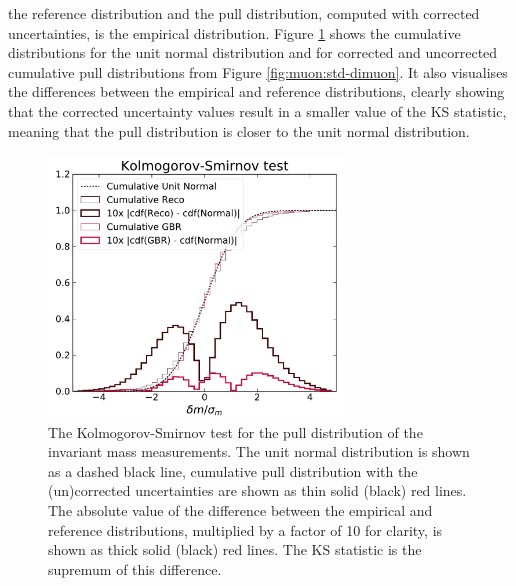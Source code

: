 the reference distribution and the pull distribution, computed with
corrected uncertainties, is the empirical distribution. Figure
\ref{fig:muon:std-ks} shows the cumulative distributions for the unit
normal distribution and for corrected and uncorrected cumulative pull
distributions from Figure \ref{fig:muon:std-dimuon}. It also visualises
the differences between the empirical and reference distributions, clearly
showing that the corrected uncertainty values result in a smaller 
value of the KS statistic, meaning that the pull distribution is closer
to the unit normal distribution.
\begin{figure}[h!]
  \centering
  \includegraphics[width=0.7\textwidth]{figures/muons/vader-std-ks}
  \caption[Kolmogorov-Smirnov statistic of the uncertainty correction]
  {The Kolmogorov-Smirnov test for the pull distribution of the invariant
  mass measurements. The unit normal distribution is shown as a dashed black
  line, cumulative pull distribution with the (un)corrected uncertainties
  are shown as thin solid (black) red lines. The absolute value of the
  difference between the empirical and reference distributions,
  multiplied by a factor of 10 for clarity, is shown as thick solid
  (black) red lines. The KS statistic is the supremum of this difference.
  }
  \label{fig:muon:std-ks}
\end{figure}

